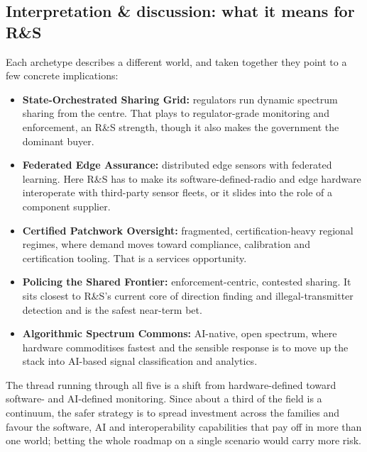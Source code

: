 \documentclass[11pt,a4paper]{article}
\begin{document}
\subsection{Interpretation \& discussion: what it means for R\&S}
Each archetype describes a different world, and taken together they point to a few concrete implications:
\begin{itemize}
  \item \textbf{State-Orchestrated Sharing Grid:} regulators run dynamic spectrum sharing from the centre.
  That plays to regulator-grade monitoring and enforcement, an R\&S strength, though it also makes the
  government the dominant buyer.
  \item \textbf{Federated Edge Assurance:} distributed edge sensors with federated learning. Here R\&S has
  to make its software-defined-radio and edge hardware interoperate with third-party sensor fleets, or it
  slides into the role of a component supplier.
  \item \textbf{Certified Patchwork Oversight:} fragmented, certification-heavy regional regimes, where
  demand moves toward compliance, calibration and certification tooling. That is a services opportunity.
  \item \textbf{Policing the Shared Frontier:} enforcement-centric, contested sharing. It sits closest to
  R\&S's current core of direction finding and illegal-transmitter detection and is the safest near-term
  bet.
  \item \textbf{Algorithmic Spectrum Commons:} AI-native, open spectrum, where hardware commoditises fastest
  and the sensible response is to move up the stack into AI-based signal classification and analytics.
\end{itemize}
The thread running through all five is a shift from hardware-defined toward software- and AI-defined
monitoring. Since about a third of the field is a continuum, the safer strategy is to spread investment
across the families and favour the software, AI and interoperability capabilities that pay off in more than
one world; betting the whole roadmap on a single scenario would carry more risk.

\end{document}
